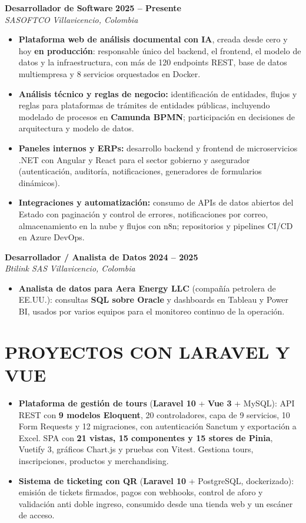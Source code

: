 \documentclass[letterpaper,10pt]{article}
\begin{document}
\textbf{Desarrollador de Software} \hfill \textbf{2025 -- Presente} \\
\textit{SASOFTCO} \hfill \textit{Villavicencio, Colombia}
\begin{itemize}
    \item \textbf{Plataforma web de análisis documental con IA}, creada desde cero y hoy \textbf{en producción}: responsable único del backend, el frontend, el modelo de datos y la infraestructura, con más de 120 endpoints REST, base de datos multiempresa y 8 servicios orquestados en Docker.
    \item \textbf{Análisis técnico y reglas de negocio:} identificación de entidades, flujos y reglas para plataformas de trámites de entidades públicas, incluyendo modelado de procesos en \textbf{Camunda BPMN}; participación en decisiones de arquitectura y modelo de datos.
    \item \textbf{Paneles internos y ERPs:} desarrollo backend y frontend de microservicios .NET con Angular y React para el sector gobierno y asegurador (autenticación, auditoría, notificaciones, generadores de formularios dinámicos).
    \item \textbf{Integraciones y automatización:} consumo de APIs de datos abiertos del Estado con paginación y control de errores, notificaciones por correo, almacenamiento en la nube y flujos con n8n; repositorios y pipelines CI/CD en Azure DevOps.
\end{itemize}

\textbf{Desarrollador / Analista de Datos} \hfill \textbf{2024 -- 2025} \\
\textit{Btilink SAS} \hfill \textit{Villavicencio, Colombia}
\begin{itemize}
    \item \textbf{Analista de datos para Aera Energy LLC} (compañía petrolera de EE.UU.): consultas \textbf{SQL sobre Oracle} y dashboards en Tableau y Power BI, usados por varios equipos para el monitoreo continuo de la operación.
\end{itemize}

\section{PROYECTOS CON LARAVEL Y VUE}
\begin{itemize}
    \item \textbf{Plataforma de gestión de tours} (\textbf{Laravel 10} + \textbf{Vue 3} + MySQL): API REST con \textbf{9 modelos Eloquent}, 20 controladores, capa de 9 servicios, 10 Form Requests y 12 migraciones, con autenticación Sanctum y exportación a Excel. SPA con \textbf{21 vistas, 15 componentes y 15 stores de Pinia}, Vuetify 3, gráficos Chart.js y pruebas con Vitest. Gestiona tours, inscripciones, productos y merchandising.
    \item \textbf{Sistema de ticketing con QR} (\textbf{Laravel 10} + PostgreSQL, dockerizado): emisión de tickets firmados, pagos con webhooks, control de aforo y validación anti doble ingreso, consumido desde una tienda web y un escáner de acceso.
\end{itemize}
\end{document}
